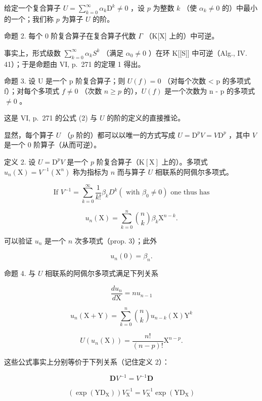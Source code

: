 给定一个复合算子 \(U = \sum_{k=0}^{\infty} \alpha_k \mathrm{D}^k \neq 0\) ，设 \(p\) 为整数 \(k\) （使 \(\alpha_k \neq 0\) 的）中最小的一个；我们称 \(p\) 为算子 \(U\) 的阶。

命题 2. 每个 0 阶复合算子在复合算子代数 \(\Gamma\) （K{[}X{]} 上的）中可逆。

事实上，形式级数 \(\sum_{k=0}^{\infty}\alpha_{k}S^{k}\) （满足 \(\alpha_{0}\neq0\) ）在环 K{[}{[}S{]}{]} 中可逆（Alg., IV. 41）；于是命题由 VI, p.~271 的定理 1 得出。

命题 3. 设 U 是一个 p 阶复合算子；则 \(U(f) = 0\) （对每个次数 \textless{} p 的多项式 f）；对每个多项式 \(f \neq 0\) （次数 \(n \geqslant p\) 的），\(U(f)\) 是一个次数为 n - p 的多项式 \(\neq 0\) 。

这是 VI, p.~271 的公式 (2) 与 \(U\) 的阶的定义的直接推论。

显然，每个算子 \(U\) （\(p\) 阶的）都可以以唯一的方式写成 \(U = \mathrm{D}^p V = V\mathrm{D}^p\) ，其中 \(V\) 是一个 0 阶算子（从而可逆）。

定义 2. 设 \(U = \mathrm{D}^p V\) 是一个 \(p\) 阶复合算子（\(\mathrm{K}[\mathrm{X}]\) 上的）。多项式 \(u_n(\mathrm{X}) = V^{-1}(\mathrm{X}^n)\) 称为指标为 \(n\) 而与算子 \(U\) 相联系的阿佩尔多项式。

\[
\text {   If   } V ^ {- 1} = \sum_ {k = 0} ^ {\infty} \frac {1}{k !} \beta_ {k} D ^ {k} (\text {   with   } \beta_ {0} \neq 0) \text {   one   thus   has   }
\]

\[
u _ {n} (\mathrm{X}) = \sum_ {k = 0} ^ {n} {\binom {n} {k}} \beta_ {k}   \mathrm{X} ^ {n - k}.\tag{6}
\]

可以验证 \(u_{n}\) 是一个 \(n\) 次多项式（prop. 3）；此外

\[
u _ {n} (0) = \beta_ {n}.
\]

命题 4. 与 \(U\) 相联系的阿佩尔多项式满足下列关系

\[
\frac {d u _ {n}}{d \mathrm{X}} = n u _ {n - 1}\tag{7}
\]

\[
u _ {n} (\mathrm{X} + \mathrm{Y}) = \sum_ {k = 0} ^ {n} {\binom {n} {k}} u _ {n - k} (\mathrm{X})   \mathrm{Y} ^ {k}\tag{8}
\]

\[
U \left(u _ {n} (\mathrm{X})\right) = \frac {n !}{(n - p) !} \mathrm{X} ^ {n - p}.\tag{9}
\]

这些公式事实上分别等价于下列关系（记住定义 2）：

\[
\mathbf {D} V ^ {- 1} = V ^ {- 1} \mathbf {D}\tag{10}
\]

\[
\left(\exp \left(\mathrm{YD} _ {\mathrm{X}}\right)\right) V _ {\mathrm{X}} ^ {- 1} = V _ {\mathrm{X}} ^ {- 1} \exp \left(\mathrm{YD} _ {\mathrm{X}}\right)\tag{11}
\]

